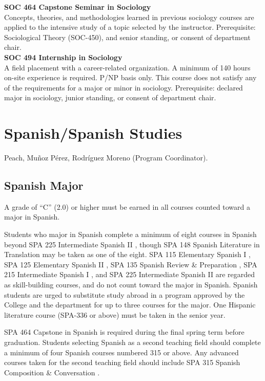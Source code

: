 \documentclass[
  letterpaper,
]{scrbook}
\begin{document}
\textbf{SOC 464 Capstone Seminar in Sociology}\\
Concepts, theories, and methodologies learned in previous sociology
courses are applied to the intensive study of a topic selected by the
instructor. Prerequisite: Sociological Theory (SOC-450), and senior
standing, or consent of department chair.\\
\textbf{SOC 494 Internship in Sociology}\\
A field placement with a career-related organization. A minimum of 140
hours on-site experience is required. P/NP basis only. This course does
not satisfy any of the requirements for a major or minor in sociology.
Prerequisite: declared major in sociology, junior standing, or consent
of department chair.

\section{Spanish/Spanish Studies}\label{spanishspanish-studies}

Peach, Muñoz Pérez, Rodríguez Moreno (Program Coordinator).

\subsection{Spanish Major}\label{spanish-major}

A grade of ``C'' (2.0) or higher must be earned in all courses counted
toward a major in Spanish.

Students who major in Spanish complete a minimum of eight courses in
Spanish beyond SPA 225 Intermediate Spanish II , though SPA 148 Spanish
Literature in Translation may be taken as one of the eight. SPA 115
Elementary Spanish I , SPA 125 Elementary Spanish II , SPA 135 Spanish
Review \& Preparation , SPA 215 Intermediate Spanish I , and SPA 225
Intermediate Spanish II are regarded as skill-building courses, and do
not count toward the major in Spanish. Spanish students are urged to
substitute study abroad in a program approved by the College and the
department for up to three courses for the major. One Hispanic
literature course (SPA-336 or above) must be taken in the senior year.

SPA 464 Capstone in Spanish is required during the final spring term
before graduation. Students selecting Spanish as a second teaching field
should complete a minimum of four Spanish courses numbered 315 or above.
Any advanced courses taken for the second teaching field should include
SPA 315 Spanish Composition \& Conversation .
\end{document}

